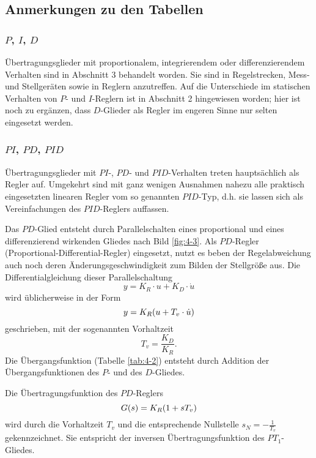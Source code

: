 \subsection{Anmerkungen zu den Tabellen}


\subsubsection{$P$, $I$, $D$}

Übertragungsglieder mit proportionalem, integrierendem oder differenzierendem Verhalten sind in Abschnitt 3 behandelt worden.
Sie sind in Regelstrecken, Mess- und Stellgeräten sowie in Reglern anzutreffen.
Auf die Unterschiede im statischen Verhalten von \(P\)- und \(I\)-Reglern ist in Abschnitt 2 hingewiesen worden; hier ist noch zu ergänzen, dass \(D\)-Glieder als Regler im engeren Sinne nur selten eingesetzt werden.


\subsubsection{$PI$, $PD$, $PID$}

Übertragungsglieder mit \(PI\)-, \(PD\)- und \(PID\)-Verhalten treten hauptsächlich als Regler auf.
Umgekehrt sind mit ganz wenigen Ausnahmen nahezu alle praktisch eingesetzten linearen Regler vom so genannten \(PID\)-Typ, d.h. sie lassen sich als Vereinfachungen des \(PID\)-Reglers auffassen.

Das \(PD\)-Glied entsteht durch Parallelschalten eines proportional und eines differenzierend wirkenden Gliedes nach Bild \ref{fig:4-3}.
Als \(PD\)-Regler (Proportional-Differential-Regler) eingesetzt, nutzt es beben der Regelabweichung auch noch deren Änderungsgeschwindigkeit zum Bilden der Stellgröße aus.
Die Differentialgleichung dieser Parallelschaltung
\begin{equation}
	y = K_R \cdot u + K_D \cdot \dot{u}
\end{equation}
wird üblicherweise in der Form
\[
	y = K_R \parentheses*{u + T_v \cdot \dot{u}}
\]
geschrieben, mit der sogenannten Vorhaltzeit
\[
	T_v = \frac{K_D}{K_R}.
\]
Die Übergangsfunktion (Tabelle \ref{tab:4-2}) entsteht durch Addition der Übergangsfunktionen des \(P\)- und des \(D\)-Gliedes.

Die Übertragungsfunktion des \(PD\)-Reglers
\begin{equation}
	G\parentheses*{s} = K_R\parentheses*{1 + sT_v}
\end{equation}
wird durch die Vorhaltzeit \(T_v\) und die entsprechende Nullstelle \(s_N = -\frac{1}{T_v}\) gekennzeichnet.
Sie entspricht der inversen Übertragungsfunktion des \(PT_1\)-Gliedes.

